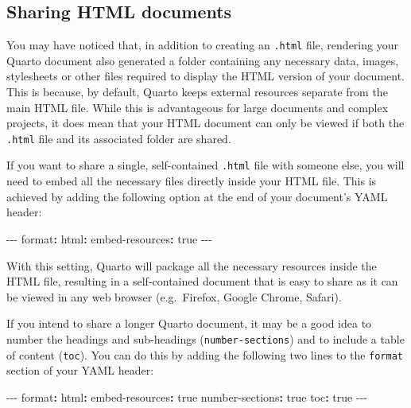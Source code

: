 \documentclass[
  letterpaper,
  DIV=11,
  numbers=noendperiod]{scrreprt}
\newenvironment{Shaded}{\begin{snugshade}}{\end{snugshade}}
\newcommand{\AttributeTok}[1]{\textcolor[rgb]{0.40,0.45,0.13}{#1}}
\newcommand{\CharTok}[1]{\textcolor[rgb]{0.13,0.47,0.30}{#1}}
\newcommand{\FunctionTok}[1]{\textcolor[rgb]{0.28,0.35,0.67}{#1}}
\newcommand{\KeywordTok}[1]{\textcolor[rgb]{0.00,0.23,0.31}{\textbf{#1}}}
\newcommand{\PreprocessorTok}[1]{\textcolor[rgb]{0.68,0.00,0.00}{#1}}
\begin{document}
\subsection{Sharing HTML documents}\label{sec-EmbedResources}

You may have noticed that, in addition to creating an \texttt{.html}
file, rendering your Quarto document also generated a folder containing
any necessary data, images, stylesheets or other files required to
display the HTML version of your document. This is because, by default,
Quarto keeps external resources separate from the main HTML file. While
this is advantageous for large documents and complex projects, it does
mean that your HTML document can only be viewed if both the
\texttt{.html} file and its associated folder are shared.

If you want to share a single, self-contained \texttt{.html} file with
someone else, you will need to embed all the necessary files directly
inside your HTML file. This is achieved by adding the following option
at the end of your document's YAML header:

\begin{Shaded}
\begin{Highlighting}[]
\PreprocessorTok{{-}{-}{-}}
\FunctionTok{format}\KeywordTok{:}
\AttributeTok{  }\FunctionTok{html}\KeywordTok{:}
\AttributeTok{    }\FunctionTok{embed{-}resources}\KeywordTok{:}\AttributeTok{ }\CharTok{true}
\PreprocessorTok{{-}{-}{-}}
\end{Highlighting}
\end{Shaded}

With this setting, Quarto will package all the necessary resources
inside the HTML file, resulting in a self-contained document that is
easy to share as it can be viewed in any web browser (e.g.~Firefox,
Google Chrome, Safari).

If you intend to share a longer Quarto document, it may be a good idea
to number the headings and sub-headings (\texttt{number-sections}) and
to include a table of content (\texttt{toc}). You can do this by adding
the following two lines to the \texttt{format} section of your YAML
header:

\begin{Shaded}
\begin{Highlighting}[]
\PreprocessorTok{{-}{-}{-}}
\FunctionTok{format}\KeywordTok{:}
\AttributeTok{  }\FunctionTok{html}\KeywordTok{:}
\AttributeTok{    }\FunctionTok{embed{-}resources}\KeywordTok{:}\AttributeTok{ }\CharTok{true}
\AttributeTok{    }\FunctionTok{number{-}sections}\KeywordTok{:}\AttributeTok{ }\CharTok{true}
\AttributeTok{    }\FunctionTok{toc}\KeywordTok{:}\AttributeTok{ }\CharTok{true}
\PreprocessorTok{{-}{-}{-}}
\end{Highlighting}
\end{Shaded}
\end{document}
